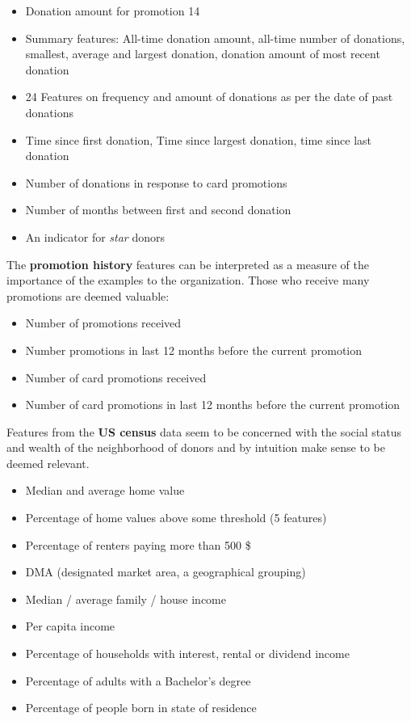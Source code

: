 \documentclass[
  11pt,
  a4paper,
  DIV=12,captions=tableheading,oneside,titlepage]{scrbook}
\providecommand{\tightlist}{%
  \setlength{\itemsep}{0pt}\setlength{\parskip}{0pt}}
\begin{document}
\begin{itemize}
\tightlist
\item
  Donation amount for promotion 14
\item
  Summary features: All-time donation amount, all-time number of donations, smallest, average and largest donation, donation amount of most recent donation
\item
  24 Features on frequency and amount of donations as per the date of past donations
\item
  Time since first donation, Time since largest donation, time since last donation
\item
  Number of donations in response to card promotions
\item
  Number of months between first and second donation
\item
  An indicator for \emph{star} donors
\end{itemize}

The \textbf{promotion history} features can be interpreted as a measure of the importance of the examples to the organization. Those who receive many promotions are deemed valuable:

\begin{itemize}
\tightlist
\item
  Number of promotions received
\item
  Number promotions in last 12 months before the current promotion
\item
  Number of card promotions received
\item
  Number of card promotions in last 12 months before the current promotion
\end{itemize}

Features from the \textbf{US census} data seem to be concerned with the social status and wealth of the neighborhood of donors and by intuition make sense to be deemed relevant.

\begin{itemize}
\tightlist
\item
  Median and average home value
\item
  Percentage of home values above some threshold (5 features)
\item
  Percentage of renters paying more than 500 \$
\item
  DMA (designated market area, a geographical grouping)
\item
  Median / average family / house income
\item
  Per capita income
\item
  Percentage of households with interest, rental or dividend income
\item
  Percentage of adults with a Bachelor's degree
\item
  Percentage of people born in state of residence
\end{itemize}
\end{document}
